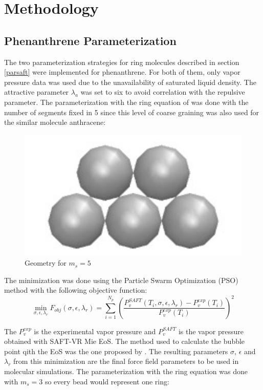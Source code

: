 \chapter{Methodology} %

\label{Chapter4} %

\section{Phenanthrene Parameterization}\label{parame}

The two parameterization strategies for ring molecules described in section \ref{parsaft} were implemented for phenanthrene. For both of them, only vapor pressure data \cite{pvphen} was used due to the unavailability of saturated liquid density. The attractive parameter $\lambda _{a}$ was set to six to avoid correlation with the repulsive parameter. The parameterization with the ring equation of  was done with the number of segments fixed in 5 since this level of coarse graining was also used for the similar molecule anthracene:
\begin{figure}[th]
\centering
\includegraphics[width=0.25\linewidth]{Figures/fen5}
\caption{Geometry for $m_{s}=5$}
\label{fig:fen5}
\end{figure}

The minimization was done using the Particle Swarm Optimization (PSO) method with the following objective function:
\begin{equation}
\min\limits_{\sigma,\epsilon,\lambda_{r}} F_{obj}(\sigma,\epsilon,\lambda_{r})= \sum_{i=1}^{N_{p}} \left(\frac{P_{v}^{SAFT}(T_{i},\sigma,\epsilon,\lambda_{r})-P_{v}^{exp}(T_{i})}{P_{v}^{exp}(T_{i})} \right)^2
\label{eqn:fobjm}
\end{equation}

The $P_{v}^{exp}$ is the experimental vapor pressure and $P_{v}^{SAFT}$ is the vapor pressure obtained with SAFT-VR Mie EoS. The method used to calculate the bubble point qith the EoS was the one proposed by . The resulting  parameters $\sigma$, $\epsilon $ and $\lambda _{r}$ from this minimization are the final force field parameters to be used in molecular simulations. The parameterization with the  ring equation was done with $m_{s}=3$ so every bead would represent one ring:

